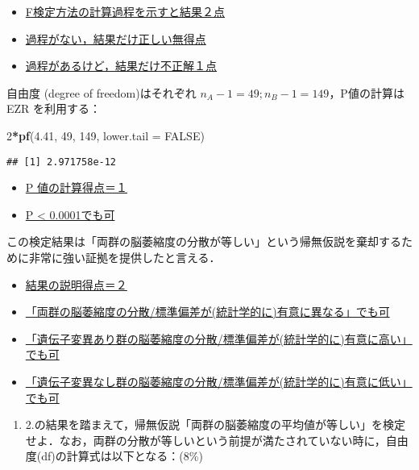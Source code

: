\documentclass[11pt,]{problemset}
\newenvironment{Shaded}{\begin{snugshade}}{\end{snugshade}}
\newcommand{\DataTypeTok}[1]{\textcolor[rgb]{0.13,0.29,0.53}{#1}}
\newcommand{\DecValTok}[1]{\textcolor[rgb]{0.00,0.00,0.81}{#1}}
\newcommand{\FloatTok}[1]{\textcolor[rgb]{0.00,0.00,0.81}{#1}}
\newcommand{\KeywordTok}[1]{\textcolor[rgb]{0.13,0.29,0.53}{\textbf{#1}}}
\newcommand{\NormalTok}[1]{#1}
\newcommand{\OperatorTok}[1]{\textcolor[rgb]{0.81,0.36,0.00}{\textbf{#1}}}
\newcommand{\OtherTok}[1]{\textcolor[rgb]{0.56,0.35,0.01}{#1}}
\providecommand{\tightlist}{%
  \setlength{\itemsep}{0pt}\setlength{\parskip}{0pt}}
\begin{document}
\begin{itemize}
\item
  \underline{F検定方法の計算過程を示すと結果２点}
\item
  \underline{過程がない，結果だけ正しい無得点}
\item
  \underline{過程があるけど，結果だけ不正解１点}
\end{itemize}

自由度 (degree of freedom)はそれぞれ
\(n_A - 1 = 49; n_B -1 = 149\)，P値の計算は EZR を利用する：

\begin{Shaded}
\begin{Highlighting}[]
\DecValTok{2}\OperatorTok{*}\KeywordTok{pf}\NormalTok{(}\FloatTok{4.41}\NormalTok{, }\DecValTok{49}\NormalTok{, }\DecValTok{149}\NormalTok{, }\DataTypeTok{lower.tail =} \OtherTok{FALSE}\NormalTok{)}
\end{Highlighting}
\end{Shaded}

\begin{verbatim}
## [1] 2.971758e-12
\end{verbatim}

\begin{itemize}
\item
  \underline{P 値の計算得点＝１}
\item
  \underline{P < 0.0001でも可}
\end{itemize}

この検定結果は「両群の脳萎縮度の分散が等しい」という帰無仮説を棄却するために非常に強い証拠を提供したと言える．

\begin{itemize}
\item
  \underline{結果の説明得点＝２}
\item
  \underline{「両群の脳萎縮度の分散/標準偏差が(統計学的に)有意に異なる」でも可}
\item
  \underline{「遺伝子変異あり群の脳萎縮度の分散/標準偏差が(統計学的に)有意に高い」でも可}
\item
  \underline{「遺伝子変異なし群の脳萎縮度の分散/標準偏差が(統計学的に)有意に低い」でも可}
\end{itemize}

\newpage

\begin{enumerate}
\def\labelenumi{\arabic{enumi}.}
\setcounter{enumi}{2}
\tightlist
\item
  2.の結果を踏まえて，帰無仮説「両群の脳萎縮度の平均値が等しい」を検定せよ．なお，両群の分散が等しいという前提が満たされていない時に，自由度(df)の計算式は以下となる：(8\%)
\end{enumerate}
\end{document}
